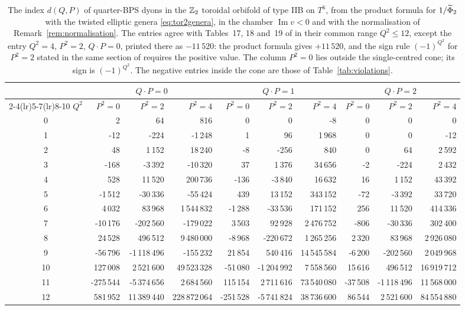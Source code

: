 \begin{table}[t]
\centering\footnotesize
\setlength{\tabcolsep}{4pt}
\begin{tabular}{@{}c*{9}{r}@{}}
\toprule
& \multicolumn{3}{c}{$Q\cdot P=0$} & \multicolumn{3}{c}{$Q\cdot P=1$} & \multicolumn{3}{c}{$Q\cdot P=2$}\\
\cmidrule(lr){2-4}\cmidrule(lr){5-7}\cmidrule(lr){8-10}
$Q^2$ & $P^2=0$ & $P^2=2$ & $P^2=4$ & $P^2=0$ & $P^2=2$ & $P^2=4$ & $P^2=0$ & $P^2=2$ & $P^2=4$ \\
\midrule
0 & 2 & 64 & 816 & 0 & 0 & -8 & 0 & 0 & 0 \\
1 & -12 & -224 & -1\,248 & 1 & 96 & 1\,968 & 0 & 0 & -12 \\
2 & 48 & 1\,152 & 18\,240 & -8 & -256 & 840 & 0 & 64 & 2\,592 \\
3 & -168 & -3\,392 & -10\,320 & 37 & 1\,376 & 34\,656 & -2 & -224 & 2\,432 \\
4 & 528 & 11\,520 & 200\,736 & -136 & -3\,840 & 16\,632 & 16 & 1\,152 & 43\,392 \\
5 & -1\,512 & -30\,336 & -55\,424 & 439 & 13\,152 & 343\,152 & -72 & -3\,392 & 33\,720 \\
6 & 4\,032 & 83\,968 & 1\,544\,832 & -1\,288 & -33\,536 & 171\,152 & 256 & 11\,520 & 414\,336 \\
7 & -10\,176 & -202\,560 & -179\,022 & 3\,503 & 92\,928 & 2\,476\,752 & -806 & -30\,336 & 302\,400 \\
8 & 24\,528 & 496\,512 & 9\,480\,000 & -8\,968 & -220\,672 & 1\,265\,256 & 2\,320 & 83\,968 & 2\,926\,080 \\
9 & -56\,796 & -1\,118\,496 & -155\,232 & 21\,854 & 540\,416 & 14\,545\,584 & -6\,200 & -202\,560 & 2\,049\,968 \\
10 & 127\,008 & 2\,521\,600 & 49\,523\,328 & -51\,080 & -1\,204\,992 & 7\,558\,560 & 15\,616 & 496\,512 & 16\,919\,712 \\
11 & -275\,544 & -5\,374\,656 & 2\,684\,560 & 115\,154 & 2\,711\,616 & 73\,540\,080 & -37\,508 & -1\,118\,496 & 11\,568\,000 \\
12 & 581\,952 & 11\,389\,440 & 228\,872\,064 & -251\,528 & -5\,741\,824 & 38\,736\,600 & 86\,544 & 2\,521\,600 & 84\,554\,880 \\
\bottomrule
\end{tabular}
\caption{The index $d(Q,P)$ of quarter-BPS dyons in the $\mathbb{Z}_2$ toroidal orbifold of type IIB on $T^6$, from the product formula for $1/\widetilde{\Phi}_2$ with the twisted elliptic genera \eqref{eq:tor2genera}, in the chamber $\operatorname{Im} v<0$ and with the normalisation of Remark~\ref{rem:normalisation}. The entries agree with Tables~17, 18 and~19 of \cite{CD19} in their common range $Q^2\le 12$, except the entry $Q^2=4$, $P^2=2$, $Q\cdot P=0$, printed there as $-11\,520$: the product formula gives $+11\,520$, and the sign rule $(-1)^{Q^2}$ for $P^2=2$ stated in the same section of \cite{CD19} requires the positive value. The column $P^2=0$ lies outside the single-centred cone; its sign is $(-1)^{Q^2}$. The negative entries inside the cone are those of Table~\ref{tab:violations}.}
\label{tab:tor2}
\end{table}

